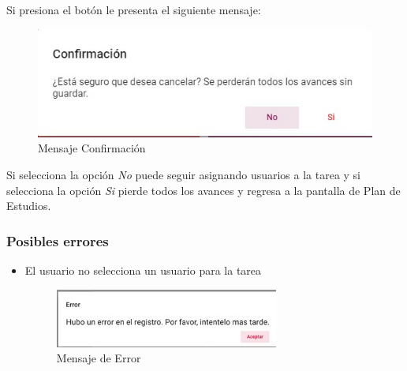        Si presiona el botón  le presenta el siguiente mensaje:

        \begin{figure}[H]
            \centering
            \hypertarget{confirma}{\includegraphics[width=0.7\linewidth]{images/Tareas/Confirmacion}}
            \caption{Mensaje Confirmación}
            \label{conrifma}
        \end{figure}

        Si selecciona la opción \textit{No} puede seguir asignando usuarios a la tarea y si selecciona la opción \textit{Si} pierde todos los avances y regresa a la pantalla de Plan de Estudios.

            \subsubsection{Posibles errores}

                \begin{itemize}
                    \item El usuario no selecciona un usuario para la tarea
                    \begin{figure}[H]
                    \centering
                    \hypertarget{error}{\includegraphics[width=0.7\linewidth]{images/Tareas/Error}}
                    \caption{Mensaje de Error}
                    \label{error}
                    \end{figure}
                \end{itemize}

